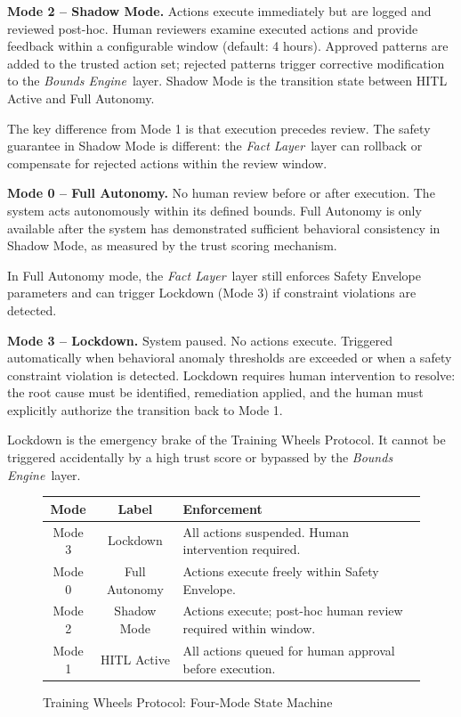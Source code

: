 \documentclass[12pt]{article}
\newcommand{\bounds}{\textit{Bounds Engine}}
\newcommand{\fact}{\textit{Fact Layer}}
\begin{document}
\medskip\noindent\textbf{Mode 2 -- Shadow Mode.}
Actions execute immediately but are logged and reviewed post-hoc. Human reviewers examine executed actions and provide feedback within a configurable window (default: 4 hours). Approved patterns are added to the trusted action set; rejected patterns trigger corrective modification to the \bounds\ layer. Shadow Mode is the transition state between HITL Active and Full Autonomy.

The key difference from Mode 1 is that execution precedes review. The safety guarantee in Shadow Mode is different: the \fact\ layer can rollback or compensate for rejected actions within the review window.

\medskip\noindent\textbf{Mode 0 -- Full Autonomy.}
No human review before or after execution. The system acts autonomously within its defined bounds. Full Autonomy is only available after the system has demonstrated sufficient behavioral consistency in Shadow Mode, as measured by the trust scoring mechanism.

In Full Autonomy mode, the \fact\ layer still enforces Safety Envelope parameters and can trigger Lockdown (Mode 3) if constraint violations are detected.

\medskip\noindent\textbf{Mode 3 -- Lockdown.}
System paused. No actions execute. Triggered automatically when behavioral anomaly thresholds are exceeded or when a safety constraint violation is detected. Lockdown requires human intervention to resolve: the root cause must be identified, remediation applied, and the human must explicitly authorize the transition back to Mode 1.

Lockdown is the emergency brake of the Training Wheels Protocol. It cannot be triggered accidentally by a high trust score or bypassed by the \bounds\ layer.

\begin{figure}[htbp]
\begin{center}
\caption{Training Wheels Protocol: Four-Mode State Machine}
\label{fig:twp-state-machine}
\small
\begin{tabular}{ccl}
\toprule
\textbf{Mode} & \textbf{Label} & \textbf{Enforcement} \\
\midrule
Mode 3 & Lockdown & All actions suspended. Human intervention required. \\
Mode 0 & Full Autonomy & Actions execute freely within Safety Envelope. \\
Mode 2 & Shadow Mode & Actions execute; post-hoc human review required within window. \\
Mode 1 & HITL Active & All actions queued for human approval before execution. \\
\bottomrule
\end{tabular}
\end{center}
\end{figure}
\end{document}
